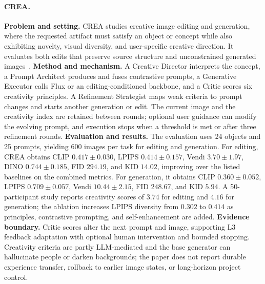 \paragraph{CREA.}
\textbf{Problem and setting.} CREA studies creative image editing and generation, where the requested artifact must satisfy an object or concept while also exhibiting novelty, visual diversity, and user-specific creative direction. It evaluates both edits that preserve source structure and unconstrained generated images~\cite{venkatesh2025crea}. \textbf{Method and mechanism.} A Creative Director interprets the concept, a Prompt Architect produces and fuses contrastive prompts, a Generative Executor calls Flux or an editing-conditioned backbone, and a Critic scores six creativity principles. A Refinement Strategist maps weak criteria to prompt changes and starts another generation or edit. The current image and the creativity index are retained between rounds; optional user guidance can modify the evolving prompt, and execution stops when a threshold is met or after three refinement rounds. \textbf{Evaluation and results.} The evaluation uses 24 objects and 25 prompts, yielding 600 images per task for editing and generation. For editing, CREA obtains CLIP $0.417\pm0.030$, LPIPS $0.414\pm0.157$, Vendi $3.70\pm1.97$, DINO $0.744\pm0.185$, FID $294.19$, and KID $14.02$, improving over the listed baselines on the combined metrics. For generation, it obtains CLIP $0.360\pm0.052$, LPIPS $0.709\pm0.057$, Vendi $10.44\pm2.15$, FID $248.67$, and KID $5.94$. A 50-participant study reports creativity scores of $3.74$ for editing and $4.16$ for generation; the ablation increases LPIPS diversity from $0.302$ to $0.414$ as principles, contrastive prompting, and self-enhancement are added. \textbf{Evidence boundary.} Critic scores alter the next prompt and image, supporting L3 feedback adaptation with optional human intervention and bounded stopping. Creativity criteria are partly LLM-mediated and the base generator can hallucinate people or darken backgrounds; the paper does not report durable experience transfer, rollback to earlier image states, or long-horizon project control.


